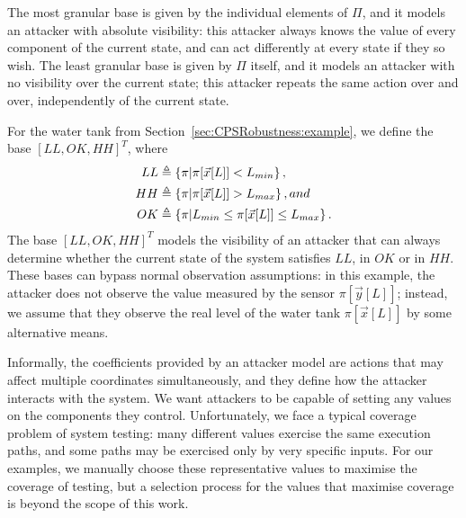 {\begin{definition}
The most granular base is given by the individual elements of $\Pi$, and it models an attacker with absolute visibility: this attacker always knows the value of every component of the current state, and can act differently at every state if they so wish. The least granular base is given by $\Pi$ itself, and it models an attacker with no visibility over the current state; this attacker repeats the same action over and over, independently of the current state.
\end{definition}
\begin{example}
  \label{ex:CPSRobustness:AttackBasis}
  For the water tank from Section~\ref{sec:CPSRobustness:example}, we define the base $[LL, OK, HH]^T$, where 
  \begin{align*}
    {LL}&\triangleq\left\{\pi| \pi[\vec{x}[L]]<L_{min}\right\},\\
    {HH}&\triangleq\left\{\pi| \pi[\vec{x}[L]]>L_{max}\right\}, and\\
    {OK}&\triangleq\left\{\pi|L_{min} \leq \pi[\vec{x}[L]]\leq L_{max}\right\}. 
  \end{align*} 
  The base $[LL, OK, HH]^T$ models the visibility of an attacker that can always determine whether the current state of the system satisfies $LL$, in $OK$ or in $HH$. These bases can bypass normal observation assumptions: in this example, the attacker does not observe the value measured by the sensor $\pi[\vec{y}[L]]$; instead, we assume that they observe the real level of the water tank $\pi[\vec{x}[L]]$ by some alternative means. %
\end{example}

Informally, the coefficients provided by an attacker model are actions that may affect multiple coordinates simultaneously, and they define how the attacker interacts with the system. We want attackers to be capable of setting any values on the components they control. Unfortunately, we face a typical coverage problem of system testing: many different values exercise the same execution paths, and some paths may be exercised only by very specific inputs. For our examples, we manually choose these representative values to maximise the coverage of testing, but a selection process for the values that maximise coverage is beyond the scope of this work.

}
